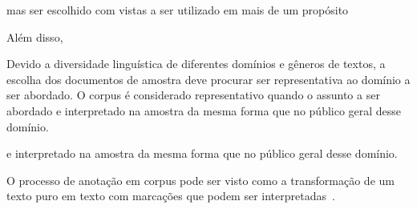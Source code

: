 








mas ser escolhido com vistas a ser utilizado em mais de um propósito


Além disso, 



Devido a diversidade linguística de diferentes domínios e gêneros de textos, a escolha dos documentos de amostra deve procurar ser representativa ao domínio a ser abordado. O corpus é considerado representativo quando o assunto a ser abordado e interpretado na amostra da mesma forma que no público geral desse domínio.


e interpretado na amostra da mesma forma que no público geral desse domínio.











O processo de anotação em corpus pode ser visto como a transformação de um texto puro em texto com marcações que podem ser interpretadas~\cite{Hovy2010}.	
























